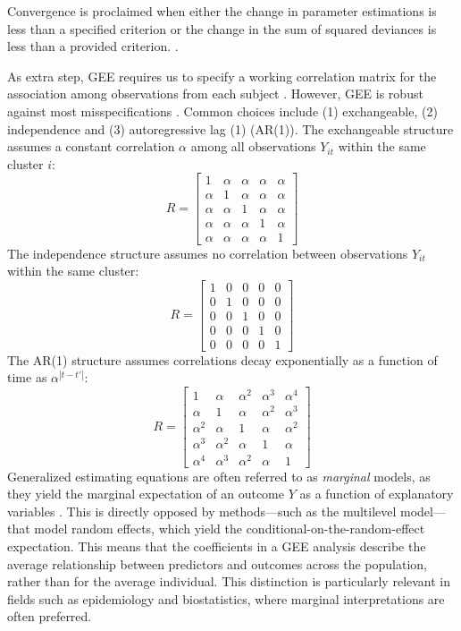 \documentclass[stu]{apa7}
\begin{document}
Convergence is proclaimed when either the change in parameter estimations is less than a specified criterion or the change in the sum of squared deviances is less than a provided criterion. \parencite[p. 92]{hardin_generalized_2012}. 

As extra step, GEE requires us to specify a working correlation matrix for the association among observations from each subject \parencite[]{diggle_analysis_2002}. However, GEE is robust against most misspecifications \parencite[]{zeger_models_1988, ballinger_using_2004}. Common choices include (1) exchangeable, (2) independence and (3) autoregressive lag (1) (AR(1)). The exchangeable structure assumes a constant correlation $\alpha$ among all observations $Y_{it}$ within the same cluster $i$:
\[
R = 
\begin{bmatrix}
1 & \alpha & \alpha & \alpha & \alpha \\
\alpha & 1 & \alpha & \alpha & \alpha \\
\alpha & \alpha & 1 & \alpha & \alpha \\
\alpha & \alpha & \alpha & 1 & \alpha \\
\alpha & \alpha & \alpha & \alpha & 1
\end{bmatrix}
\]
The independence structure assumes no correlation between observations $Y_{it}$ within the same cluster:
\[
R = 
\begin{bmatrix}
1 & 0 & 0 & 0 & 0 \\
0 & 1 & 0 & 0 & 0 \\
0 & 0 & 1 & 0 & 0 \\
0 & 0 & 0 & 1 & 0 \\
0 & 0 & 0 & 0 & 1
\end{bmatrix}
\]
The AR(1) structure assumes correlations decay exponentially as a function of time as \( \alpha^{|t-t'|} \):
\[
R = 
\begin{bmatrix}
1 & \alpha & \alpha^2 & \alpha^3 & \alpha^4 \\
\alpha & 1 & \alpha & \alpha^2 & \alpha^3 \\
\alpha^2 & \alpha & 1 & \alpha & \alpha^2 \\
\alpha^3 & \alpha^2 & \alpha & 1 & \alpha \\
\alpha^4 & \alpha^3 & \alpha^2 & \alpha & 1
\end{bmatrix}
\]
Generalized estimating equations are often referred to as \textit{marginal} models, as they yield the marginal expectation of an outcome $Y$ as a function of explanatory variables \parencite[]{diggle_analysis_2002}. This is directly opposed by methods---such as the multilevel model---that model random effects, which yield the conditional-on-the-random-effect expectation. This means that the coefficients in a GEE analysis describe the average relationship between predictors and outcomes across the population, rather than for the average individual. This distinction is particularly relevant in fields such as epidemiology and biostatistics, where marginal interpretations are often preferred.
\end{document}
